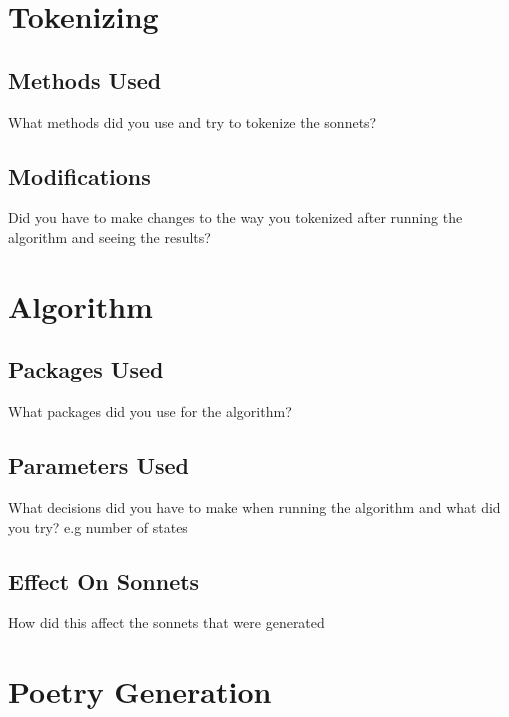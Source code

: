 \newif\ifshowsolutions
\showsolutionstrue

\newcommand{\boldline}[1]{\underline{\textbf{#1}}}



\pagestyle{fancy}

\section{Tokenizing}
\subsection{Methods Used}
What methods did you use and try to tokenize the sonnets?
\subsection{Modifications}
Did you have to make changes to the way you tokenized after running the algorithm and seeing the results?

\section{Algorithm}
\subsection{Packages Used}
What packages did you use for the algorithm?
\subsection{Parameters Used}
What decisions did you have to make when running the algorithm and what did you try? e.g number of states
\subsection{Effect On Sonnets}
How did this affect the sonnets that were generated

\section{Poetry Generation}

